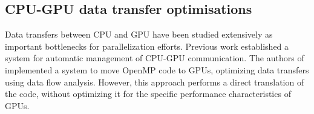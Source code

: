 \subsection{CPU-GPU data transfer optimisations}

    Data transfers between CPU and GPU have been studied extensively as
    important bottlenecks for parallelization efforts.
    Previous work \cite{Jablin:2011:ACC:1993316.1993516} established a system
    for automatic management of CPU-GPU communication.
    The authors of \cite{Lee:2009:OGC:1594835.1504194} implemented a system to
    move OpenMP code to GPUs, optimizing data transfers using data flow
    analysis.
    However, this approach performs a direct translation of the code, without
    optimizing it for the specific performance characteristics of GPUs.

